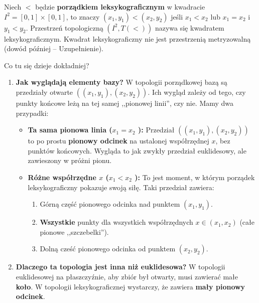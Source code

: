 \begin{eg}
	Niech $<$ będzie \textbf{porządkiem leksykograficznym} w kwadracie $I^2 = \left[ 0,1 \right] \times \left[ 0,1 \right] $, to znaczy $\left( x_1,y_1 \right) < \left( x_2,y_2 \right) $ jeśli $x_1<x_2$ lub $x_1 =x_2$ i $y_1<y_2$. Przestrzeń topologiczną $\left( I^2, T\left( < \right)  \right) $ nazywa się kwadratem leksykograficznym. Kwadrat leksykograficzny nie jest przestrzenią metryzowalną (dowód później -- Uzupełnienie).

Co tu się dzieje dokładniej?

\begin{enumerate}[label=\arabic*)]
	\item \textbf{Jak wyglądają elementy bazy?} W topologii porządkowej bazą są przedziały otwarte $\left( \left( x_1,y_1 \right) , \left( x_2,y_2 \right)  \right) $. Ich wygląd zależy od tego, czy punkty końcowe leżą na tej samej ,,pionowej linii'', czy nie. Mamy dwa przypadki:
		\begin{itemize}
			\item \textbf{Ta sama pionowa linia ($x_1= x_2$ ):} Przedział $\left( \left( x_1,y_1 \right) , \left( x_2,y_2 \right)  \right) $ to po prostu \textbf{pionowy odcinek} na ustalonej współrzędnej $x$, bez punktów końcowych. Wygląda to jak zwykły przedział euklidesowy, ale zawieszony w próżni pionu.
			\item \textbf{Różne współrzędne $x$ ($x_1 < x_2$ ):} To jest moment, w którym porządek leksykograficzny pokazuje swoją siłę. Taki przedział zawiera:
				\begin{enumerate}[label=\arabic*)]
					\item Górną część pionowego odcinka nad punktem $\left( x_1,y_1 \right) $.
					\item \textbf{Wszystkie}  punkty dla wszystkich współrzędnych $x \in \left( x_1,x_2 \right) $ (całe pionowe ,,szczebelki'').
					\item Dolną cześć pionowego odcinka od punktem $\left( x_2,y_2 \right) $.
				\end{enumerate}
		\end{itemize}
	\item \textbf{Dlaczego ta topologia jest inna niż euklidesowa?} W topologii euklidesowej na płaszczyźnie, aby zbiór był otwarty, musi zawierać małe \textbf{koło}. W topologii leksykograficznej wystarczy, że zawiera \textbf{mały pionowy odcinek}.


\end{enumerate}
\end{eg}

